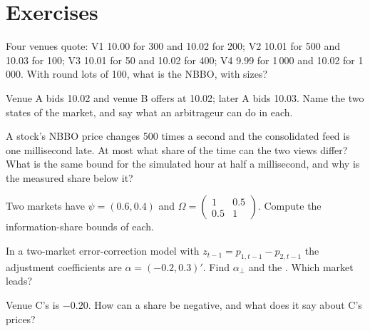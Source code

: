 \section{Exercises}

\begin{exercise}[$\star$]\label{exo:mx:fragmentation-and-routing:1}
Four venues quote: V1 10.00 for 300 and 10.02 for 200; V2 10.01 for 500 and 10.03 for 100; V3 10.01 for 50 and 10.02 for 400; V4 9.99 for 1\,000 and
10.02 for 1\,000. With round lots of 100, what is the NBBO, with sizes?
\end{exercise}

\begin{exercise}[$\star$]\label{exo:mx:fragmentation-and-routing:2}
Venue A bids 10.02 and venue B offers at 10.02; later A bids 10.03. Name the two states of the market, and say what an arbitrageur can do in each.
\end{exercise}

\begin{exercise}[$\star$]\label{exo:mx:fragmentation-and-routing:3}
A stock's NBBO price changes 500 times a second and the consolidated feed is one millisecond late. At most what share of the time can the two views
differ? What is the same bound for the simulated hour at half a millisecond, and why is the measured share below it?
\end{exercise}

\begin{exercise}[$\star\star$]\label{exo:mx:fragmentation-and-routing:4}
Two markets have $\psi=(0.6,0.4)$ and $\Omega=\begin{pmatrix}1&0.5\\0.5&1\end{pmatrix}$. Compute the information-share bounds of each.
\end{exercise}

\begin{exercise}[$\star\star$]\label{exo:mx:fragmentation-and-routing:5}
In a two-market error-correction model with $z_{t-1}=p_{1,t-1}-p_{2,t-1}$ the adjustment coefficients are $\alpha=(-0.2,0.3)'$. Find $\alpha_\perp$ and the
. Which market leads?
\end{exercise}

\begin{exercise}[$\star\star$]\label{exo:mx:fragmentation-and-routing:6}
Venue C's  is $-0.20$. How can a share be negative, and what does it say about C's prices?
\end{exercise}

